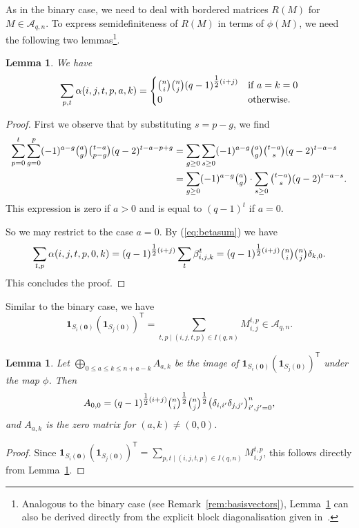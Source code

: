 \documentclass[10pt,a4paper]{article}
\newcommand{\one}{\mathbf{1}}
\newtheorem{lemma}[theorem]{Lemma}
\theoremstyle{definition}
\newcommand{\zero}{\mathbf{0}}
\newcommand{\T}{^{\mathsf{T}}}
\begin{document}
As in the binary case, we need to deal with bordered matrices $R(M)$ for $M\in \mathcal{A}_{q,n}$. To express semidefiniteness of $R(M)$ in terms of $\phi(M)$, we need the following two lemmas\footnote{Analogous to the binary case (see Remark~\ref{rem:basisvectors}), Lemma~\ref{lem:border} can also be derived directly from the explicit block diagonalisation given in~\cite{GST06}.}.
\begin{lemma}\label{lem:alphas}
We have 
\[
\sum_{p,t}\alpha(i,j,t,p,a,k)=\begin{cases}\tbinom{n}{i}\tbinom{n}{j}(q-1)^{\tfrac{1}{2}(i+j)}&\text{if $a=k=0$}\\0&\text{otherwise}.\end{cases}
\]
\end{lemma}
\begin{proof}
First we observe that by substituting $s=p-g$, we find
\begin{align*}
\sum_{p=0}^t\sum_{g=0}^p(-1)^{a-g}\tbinom{a}{g}\tbinom{t-a}{p-g}(q-2)^{t-a-p+g}& = \sum_{g\geq 0}\sum_{s\geq 0}(-1)^{a-g}\tbinom{a}{g}\tbinom{t-a}{s}(q-2)^{t-a-s} \\
& = \sum_{g\geq 0}(-1)^{a-g}\tbinom{a}{g}\cdot \sum_{s\geq 0}\tbinom{t-a}{s}(q-2)^{t-a-s}.  
\end{align*}
This expression is zero if $a>0$ and is equal to $(q-1)^t$ if $a=0$. 

So we may restrict to the case $a=0$. By (\ref{eq:betasum}) we have
\[
\sum_{t,p}\alpha(i,j,t,p,0,k)=(q-1)^{\tfrac{1}{2}(i+j)}\sum_t\beta_{i,j,k}^{t}=(q-1)^{\tfrac{1}{2}(i+j)}\tbinom{n}{i}\tbinom{n}{j}\delta_{k,0}.
\]
This concludes the proof.
\end{proof}

Similar to the binary case, we have
\[
\one_{S_i(\zero)}(\one_{S_j(\zero)})\T=\sum_{t,p\mid (i,j,t,p)\in I(q,n)}M_{i,j}^{t,p}\in \mathcal{A}_{q,n}.
\]
\begin{lemma}\label{lem:border}
Let $\bigoplus_{0\leq a\leq k\leq n+a-k} A_{a,k}$ be the image of $\one_{S_i(\zero)}(\one_{S_j(\zero)})\T$ under the map $\phi$. Then 
\[
A_{0,0}=(q-1)^{\tfrac{1}{2}(i+j)}\tbinom{n}{i}^{\tfrac{1}{2}}\tbinom{n}{j}^{\tfrac{1}{2}}\big(\delta_{i,i'}\delta_{j,j'}\big)_{i',j'=0}^n,
\]
and $A_{a,k}$ is the zero matrix for $(a,k)\neq (0,0)$.
\end{lemma}
\begin{proof}
Since $\one_{S_i(\zero)}(\one_{S_j(\zero)})\T=\sum_{p,t\mid (i,j,t,p)\in I(q,n)} M_{i,j}^{t,p}$,  
this follows directly from Lemma~\ref{lem:alphas}.
\end{proof}
\end{document}
